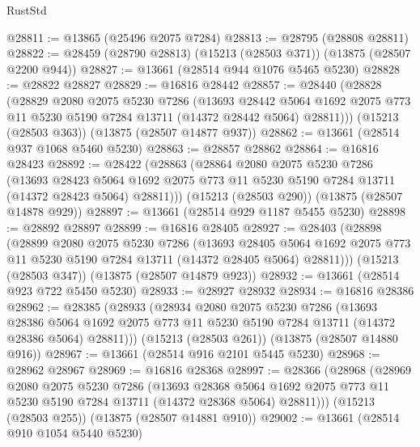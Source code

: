 \begin{lexlean}{RustStd}
\begin{coremodule}
@28811 := @13865 (@25496 @2075 @7284)
@28813 := @28795 (@28808 @28811)
@28822 := @28459 (@28790 @28813) (@15213 (@28503 @371)) (@13875 (@28507 @2200 @944))
@28827 := @13661 (@28514 @944 @1076 @5465 @5230)
@28828 := @28822 @28827
@28829 := @16816 @28442
@28857 := @28440
    (@28828
      (@28829
        @2080
        @2075
        @5230
        @7286
        (@13693
          @28442
          @5064
          @1692
          @2075
          @773
          @11
          @5230
          @5190
          @7284
          @13711
          (@14372 @28442 @5064)
          @28811)))
    (@15213 (@28503 @363))
    (@13875 (@28507 @14877 @937))
@28862 := @13661 (@28514 @937 @1068 @5460 @5230)
@28863 := @28857 @28862
@28864 := @16816 @28423
@28892 := @28422
    (@28863
      (@28864
        @2080
        @2075
        @5230
        @7286
        (@13693
          @28423
          @5064
          @1692
          @2075
          @773
          @11
          @5230
          @5190
          @7284
          @13711
          (@14372 @28423 @5064)
          @28811)))
    (@15213 (@28503 @290))
    (@13875 (@28507 @14878 @929))
@28897 := @13661 (@28514 @929 @1187 @5455 @5230)
@28898 := @28892 @28897
@28899 := @16816 @28405
@28927 := @28403
    (@28898
      (@28899
        @2080
        @2075
        @5230
        @7286
        (@13693
          @28405
          @5064
          @1692
          @2075
          @773
          @11
          @5230
          @5190
          @7284
          @13711
          (@14372 @28405 @5064)
          @28811)))
    (@15213 (@28503 @347))
    (@13875 (@28507 @14879 @923))
@28932 := @13661 (@28514 @923 @722 @5450 @5230)
@28933 := @28927 @28932
@28934 := @16816 @28386
@28962 := @28385
    (@28933
      (@28934
        @2080
        @2075
        @5230
        @7286
        (@13693
          @28386
          @5064
          @1692
          @2075
          @773
          @11
          @5230
          @5190
          @7284
          @13711
          (@14372 @28386 @5064)
          @28811)))
    (@15213 (@28503 @261))
    (@13875 (@28507 @14880 @916))
@28967 := @13661 (@28514 @916 @2101 @5445 @5230)
@28968 := @28962 @28967
@28969 := @16816 @28368
@28997 := @28366
    (@28968
      (@28969
        @2080
        @2075
        @5230
        @7286
        (@13693
          @28368
          @5064
          @1692
          @2075
          @773
          @11
          @5230
          @5190
          @7284
          @13711
          (@14372 @28368 @5064)
          @28811)))
    (@15213 (@28503 @255))
    (@13875 (@28507 @14881 @910))
@29002 := @13661 (@28514 @910 @1054 @5440 @5230)

\end{coremodule}
\end{lexlean}

